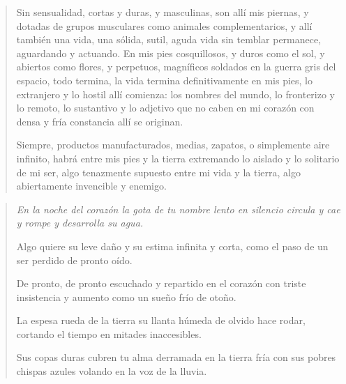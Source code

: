\documentclass[12pt]{article}
\begin{document}
\begin{verse}
Sin sensualidad, cortas y duras, y masculinas,  
son allí mis piernas, y dotadas  
de grupos musculares como animales complementarios,  
y allí también una vida, una sólida, sutil, aguda vida  
sin temblar permanece, aguardando y actuando.  
En mis pies cosquillosos,  
y duros como el sol, y abiertos como flores,  
y perpetuos, magníficos soldados  
en la guerra gris del espacio,  
todo termina, la vida termina definitivamente en mis pies,  
lo extranjero y lo hostil allí comienza:  
los nombres del mundo, lo fronterizo y lo remoto,  
lo sustantivo y lo adjetivo que no caben en mi corazón  
con densa y fría constancia allí se originan.  
  
Siempre,  
productos manufacturados, medias, zapatos,  
o simplemente aire infinito,  
habrá entre mis pies y la tierra  
extremando lo aislado y lo solitario de mi ser,  
algo tenazmente supuesto entre mi vida y la tierra,  
algo abiertamente invencible y enemigo.

\end{verse}

\clearpage
{}
\begin{verse}
\itshape
En la noche del corazón  
la gota de tu nombre lento  
en silencio circula y cae  
y rompe y desarrolla su agua.  
  
Algo quiere su leve daño  
y su estima infinita y corta,  
como el paso de un ser perdido  
de pronto oído.  
  
De pronto, de pronto escuchado  
y repartido en el corazón  
con triste insistencia y aumento  
como un sueño frío de otoño.  
  
La espesa rueda de la tierra  
su llanta húmeda de olvido  
hace rodar, cortando el tiempo  
en mitades inaccesibles.  
  
Sus copas duras cubren tu alma  
derramada en la tierra fría  
con sus pobres chispas azules  
volando en la voz de la lluvia.
\end{verse}
\end{document}
